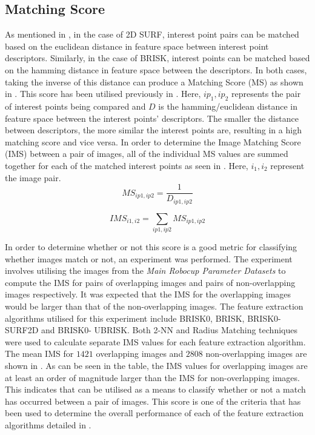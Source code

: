 \documentclass[11pt]{report}
\begin{document}
\subsection{Matching Score}
\label{sec:matchingScore}
As mentioned in , in the case of 2D SURF, interest point pairs can be matched based on the euclidean distance in feature space between interest point descriptors. Similarly, in the case of BRISK, interest points can be matched based on the hamming distance in feature space between the descriptors. In both cases, taking the inverse of this distance can produce a Matching Score (MS) as shown in . This score has been utilised previously in \cite{AndersonTechnical, Briggs}. Here, $ip_1, ip_2$ represents the pair of interest points being compared and $D$ is the hamming/euclidean distance in feature space between the interest points' descriptors. The smaller the distance between descriptors, the more similar the interest points are, resulting in a high matching score and vice versa. In order to determine the Image Matching Score (IMS) between a pair of images, all of the individual MS values are summed together for each of the matched interest points as seen in . Here, $i_1, i_2$ represent the image pair. \\

\begin{equation}
MS_{ip1, ip2} = \frac{1}{D_{ip1, ip2}}
\label{eqn:inverseDistance}
\end{equation}

\begin{equation}
IMS_{i1, i2} = \sum_{ip1, ip2} MS_{ip1, ip2}
\label{eqn:ims}
\end{equation}

In order to determine whether or not this score is a good metric for classifying whether images match or not, an experiment was performed. The experiment involves utilising the images from the \textit{Main Robocup Parameter Datasets} to compute the IMS for pairs of overlapping images and pairs of non-overlapping images respectively. It was expected that the IMS for the overlapping images would be larger than that of the non-overlapping images. The feature extraction algorithms utilised for this experiment include BRISK0, BRISK, BRISK0-SURF2D and BRISK0- UBRISK. Both 2-NN and Radius Matching techniques were used to calculate separate IMS values for each feature extraction algorithm.\\

The mean IMS for $1421$ overlapping images and $2808$ non-overlapping images are shown in . As can be seen in the table, the IMS values for overlapping images are at least an order of magnitude larger than the IMS for non-overlapping images. This indicates that  can be utilised as a means to classify whether or not a match has occurred between a pair of images. This score is one of the criteria that has been used to determine the overall performance of each of the feature extraction algorithms detailed in .\\
\end{document}
